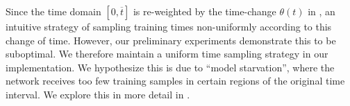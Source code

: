 Since the time domain \([0, \overline{t}]\) is re-weighted by the time-change \(\theta(t)\) in , an intuitive strategy of sampling training times non-uniformly according to this change of time. However, our preliminary experiments demonstrate this to be suboptimal.  We therefore maintain a uniform time sampling strategy in our implementation. We hypothesize this is due to ``model starvation'', where the network receives too few training samples in certain regions of the original time interval. We explore this in more detail in .




